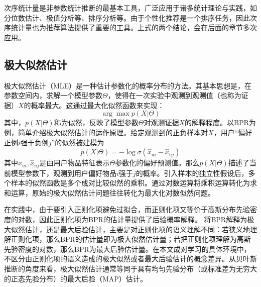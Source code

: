 次序统计量是非参数统计推断的最基本工具，广泛应用于诸多统计理论与实践，如分位数估计、极值分析等、排序分析等。由于个性化推荐是一个排序任务，因此次序统计量也为推荐算法提供了重要的工具。上式的两个结论，会在后面的章节多次应用。

\subsection{极大似然估计}
极大似然估计（MLE）是一种估计参数化的概率分布的方法。其基本思想是，在参数空间内，求解一个模型参数$\Theta$，使得在一次实验中观测到观测值（也称为证据）$X$的概率最大。这通过最大化似然函数来实现：
\[\arg \max p(X|\Theta)\]
其中，$p(X|\Theta)$称为似然，反映了模型参数$\Theta$对观测证据$X$的解释程度\cite{mou:2006}。以BPR为例，简单介绍极大似然估计的运作原理。给定观测到的正负样本对$X$，用户“偏好正例$i$强于负例$j$”的似然被建模为
\[p(X|\Theta) = -\log \sigma (\hat{x}_{ui} - \hat{x}_{uj})\]
其中$\hat{x}_{ui},\hat{x}_{uj}$是由用户物品特征表示$\Theta$参数化的偏好预测值。那么$p(X|\Theta)$描述了当前模型参数下，观测到用户偏好物品$i$强于$j$的概率。引入样本的独立性假设后，多个样本的似然函数是多个成对比较似然的乘积。通过对数运算将乘积运算转化为求和运算，原始的极大似然估计问题往往转化为最大化对数似然问题。

在实践中，由于要引入正则化项避免过拟合，而正则化项又等价于高斯分布先验密度的对数，因此正则化项为BPR的估计量提供了后验概率解释。
将BPR解释为极大似然估计，还是最大后验估计，主要是对正则化项的语义理解不同：若狭义地理解正则化项，那么BPR的估计量即为极大似然估计量；若把正则化项理解为高斯先验密度的对数，那么BPR为最大后验估计量。在本文成对学习的具体环境中，不区分由正则化项的语义造成的极大似然或者最大后验估计的概念差异。从贝叶斯推断的角度来看，极大似然估计通常等同于具有均匀先验分布（或标准差为无穷大的正态先验分布）的最大后验（MAP）估计\cite{beye:book}。







